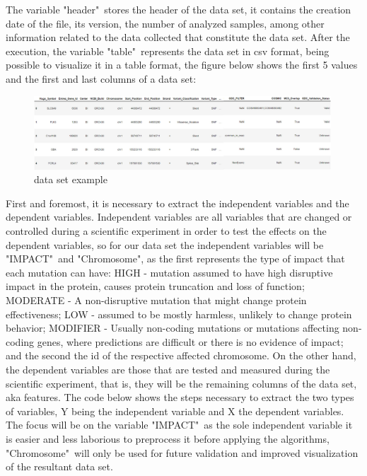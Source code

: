 The variable "header"\ stores the header of the data set, it contains the creation date of the file, its version, the number of analyzed samples, among other information related to the data collected that constitute the data set. After the execution, the variable "table"\ represents the data set in csv format, being possible to visualize it in a table format, the figure below shows the first 5 values and the first and last columns of a data set:

\begin{figure}[h]
    \centering
    \includegraphics[width=0.99\textwidth,height=0.2\textheight]{Chapters/Figures/dataset.jpg}
    \caption{data set example}
    \label{fig:dataset}
\end{figure}

First and foremost, it is necessary to extract the independent variables and the dependent variables. Independent variables are all variables that are changed or controlled during a scientific experiment in order to test the effects on the dependent variables, so for our data set the independent variables will be "IMPACT"\ and "Chromosome", as the first represents the type of impact that each mutation can have: HIGH - mutation assumed to have high disruptive impact in the protein, causes protein truncation and
loss of function; MODERATE - A non-disruptive mutation that might change protein effectiveness; LOW - assumed to be mostly harmless, unlikely to change protein behavior; MODIFIER - Usually non-coding mutations or mutations affecting non-coding genes, where predictions are difficult or there is no evidence of impact; and the second the id of the respective affected chromosome. On the other hand, the dependent variables are those that are tested and measured during the scientific experiment, that is, they will be the remaining columns of the data set, aka features. The code below shows the steps necessary to extract the two types of variables, Y being the independent variable and X the dependent variables. The focus will be on the variable "IMPACT"\ as the sole independent variable it is easier and less laborious to preprocess it before applying the algorithms, "Chromosome"\ will only be used for future validation and improved visualization of the resultant data set.

